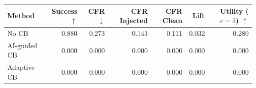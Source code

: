 \begin{tabular}{lrrrrrr}
\toprule
Method & Success $\uparrow$ & CFR $\downarrow$ & CFR Injected & CFR Clean & Lift & Utility ($c=5$) $\uparrow$ \\
\midrule
No CB & 0.880 & 0.273 & 0.143 & 0.111 & 0.032 & 0.280 \\
AI-guided CB & 0.000 & 0.000 & 0.000 & 0.000 & 0.000 & 0.000 \\
Adaptive CB & 0.000 & 0.000 & 0.000 & 0.000 & 0.000 & 0.000 \\
\bottomrule
\end{tabular}
